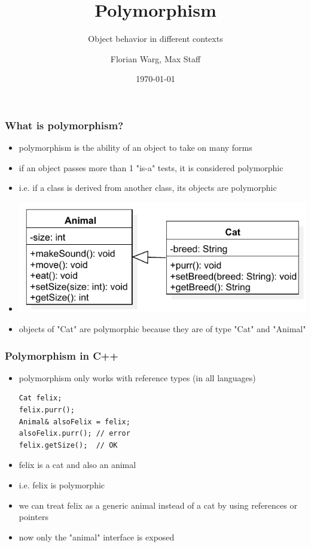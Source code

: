 



\title{Polymorphism}
\subtitle{Object behavior in different contexts}
\date{\today}
\author{Florian Warg, Max Staff}

\maketitle

\begin{frame}[fragile]
    \frametitle{What is polymorphism?}
    \begin{itemize}
    \item polymorphism is the ability of an object to take on many forms
    \item if an object passes more than 1 "is-a" tests, it is considered polymorphic
    \item i.e. if a class is derived from another class, its objects are polymorphic
    \item \includegraphics{img/polymorph-animal-cat}    
    \item objects of "Cat" are polymorphic because they are of type "Cat" and "Animal"
    \end{itemize}
\end{frame}

\begin{frame}[fragile]
    \frametitle{Polymorphism in C++}
    \begin{itemize}
    \item polymorphism only works with reference types (in all languages)
    \begin{lstlisting}[numbers=none]
Cat felix;
felix.purr();
Animal& alsoFelix = felix;
alsoFelix.purr(); // error
felix.getSize();  // OK
    \end{lstlisting}
    \item felix is a cat and also an animal
    \item i.e. felix is polymorphic
    \item we can treat felix as a generic animal instead of a cat by using references or pointers
    \item now only the "animal" interface is exposed
    \end{itemize}
\end{frame}

